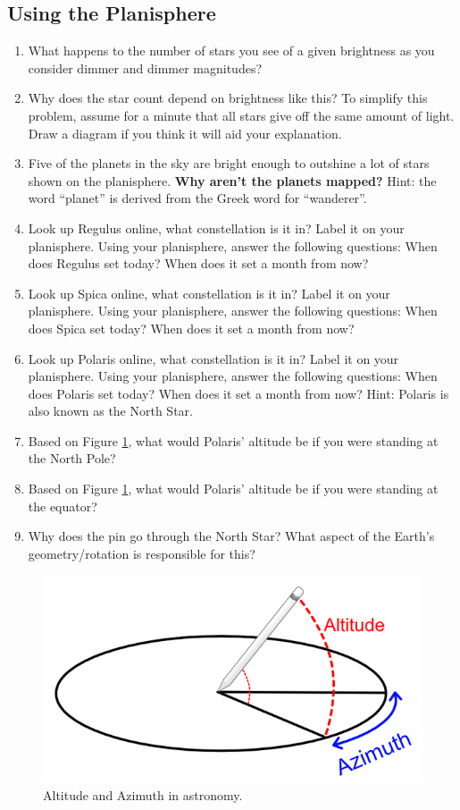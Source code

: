 \documentclass[11pt]{article}
\begin{document}
\subsection{Using the Planisphere}
\begin{enumerate}
    \item What happens to the number of stars you see of a given brightness as you consider dimmer and dimmer magnitudes?
    \item Why does the star count depend on brightness like this? To simplify this problem, assume for a minute that all stars give off the same amount of light.  Draw a diagram if you think it will aid your explanation.
    \item Five of the planets in the sky are bright enough to outshine a lot of stars shown on the planisphere. \textbf{Why aren't the planets mapped?} Hint: the word ``planet'' is derived from the Greek word for ``wanderer''.
    \item Look up Regulus online, what constellation is it in? Label it on your planisphere. Using your planisphere, answer the following questions: When does Regulus set today? When does it set a month from now?
    \item Look up Spica online, what constellation is it in? Label it on your planisphere. Using your planisphere, answer the following questions: When does Spica set today? When does it set a month from now?
    \item Look up Polaris online, what constellation is it in? Label it on your planisphere. Using your planisphere, answer the following questions: When does Polaris set today? When does it set a month from now? Hint: Polaris is also known as the North Star.
    \item Based on Figure \ref{fig: altitude}, what would Polaris' altitude be if you were standing at the North Pole?
    \item Based on Figure \ref{fig: altitude}, what would Polaris' altitude be if you were standing at the equator?
    \item Why does the pin go through the North Star?  What aspect of the Earth's geometry/rotation is responsible for this?
\end{enumerate}


\begin{figure}[htb!] 
\center
\includegraphics[width=15cm]{altitude.png}
\caption{Altitude and Azimuth in astronomy.}
\label{fig: altitude}
\end{figure}
\end{document}
